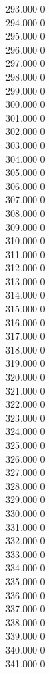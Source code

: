 { 293.000	0 \\
 294.000	0 \\
 295.000	0 \\
 296.000	0 \\
 297.000	0 \\
 298.000	0 \\
 299.000	0 \\
 300.000	0 \\
 301.000	0 \\
 302.000	0 \\
 303.000	0 \\
 304.000	0 \\
 305.000	0 \\
 306.000	0 \\
 307.000	0 \\
 308.000	0 \\
 309.000	0 \\
 310.000	0 \\
 311.000	0 \\
 312.000	0 \\
 313.000	0 \\
 314.000	0 \\
 315.000	0 \\
 316.000	0 \\
 317.000	0 \\
 318.000	0 \\
 319.000	0 \\
 320.000	0 \\
 321.000	0 \\
 322.000	0 \\
 323.000	0 \\
 324.000	0 \\
 325.000	0 \\
 326.000	0 \\
 327.000	0 \\
 328.000	0 \\
 329.000	0 \\
 330.000	0 \\
 331.000	0 \\
 332.000	0 \\
 333.000	0 \\
 334.000	0 \\
 335.000	0 \\
 336.000	0 \\
 337.000	0 \\
 338.000	0 \\
 339.000	0 \\
 340.000	0 \\
 341.000	0 \\
}
